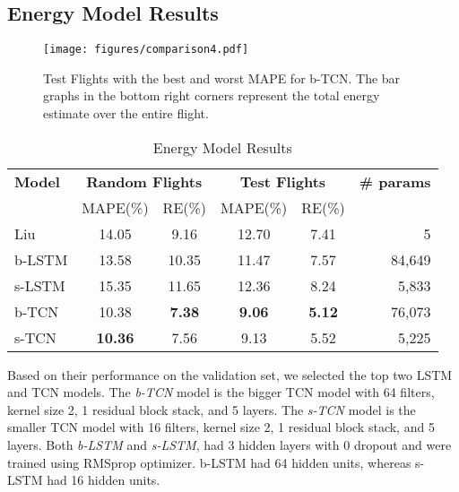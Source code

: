 \documentclass[letterpaper, 10 pt, conference]{ieeeconf}
\begin{document}
\subsection{Energy Model Results} \label{deep_results}
\begin{figure}
    \centering
    \texttt{[image: figures/comparison4.pdf]} 
\caption{Test Flights with the best and worst MAPE for b-TCN. The bar graphs in the bottom right corners represent the total energy estimate over the entire flight.}
    \label{fig:comparison}
\end{figure}
\begin{table}
    \centering
    \caption{Energy Model Results}
    \vspace{-2.5mm}
    \begin{tabular}{lccccr}
    \toprule
         \textbf{Model} & \multicolumn{2}{c}{\textbf{Random Flights}} & \multicolumn{2}{c}{\textbf{Test Flights}} & \textbf{\# params} \\
     \cmidrule{2-5}
          & MAPE(\%) & RE(\%) & MAPE(\%) & RE(\%) & \\
\midrule
    Liu \cite{liu2017power} &  14.05 & 9.16 &  12.70 & 7.41  &   5 \\
    b-LSTM &  13.58 & 10.35 &  11.47 & 7.57  &  84,649 \\
    s-LSTM &  15.35 & 11.65 &  12.36 & 8.24  &  5,833 \\
    b-TCN &   10.38 & \textbf{7.38} &  \textbf{9.06} & \textbf{5.12}  &   76,073 \\
    s-TCN &   \textbf{10.36} & 7.56 &  9.13 & 5.52 &  5,225 \\
    \bottomrule
    \end{tabular}
    \label{tab:comparison}
    \vspace{-2.5mm}
\end{table}

Based on their performance on the validation set, we selected the top two LSTM and TCN models. The \emph{b-TCN} model is the bigger TCN model with 64 filters, kernel size 2, 1 residual block stack, and 5 layers. The \emph{s-TCN} model is the smaller TCN model with 16 filters, kernel size 2, 1 residual block stack, and 5 layers. Both \emph{b-LSTM} and \emph{s-LSTM}, had 3 hidden layers with 0 dropout and were trained using RMSprop optimizer. b-LSTM had 64 hidden units, whereas s-LSTM had 16 hidden units.
\end{document}
